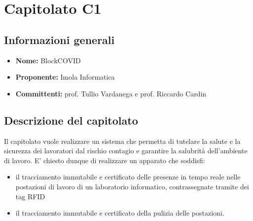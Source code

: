 \section{Capitolato C1}

\subsection{Informazioni generali}
\begin{itemize}
\item \textbf{Nome:} BlockCOVID
\item \textbf{Proponente:} Imola Informatica
\item \textbf{Committenti:} prof. Tullio Vardanega e prof. Riccardo Cardin
\end{itemize}

\subsection{Descrizione del capitolato}
Il capitolato vuole realizzare un sistema che permetta di tutelare la salute e la sicurezza dei lavoratori dal rischio contagio e garantire la salubrità dell’ambiente di lavoro. E' chiesto dunque di realizzare un apparato che soddisfi:
\begin{itemize}
\item il tracciamento immutabile e certificato delle presenze in tempo reale nelle postazioni di lavoro di un laboratorio informatico, contrassegnate tramite dei tag RFID
\item il tracciamento immutabile e certificato della pulizia delle postazioni.
\end{itemize}
